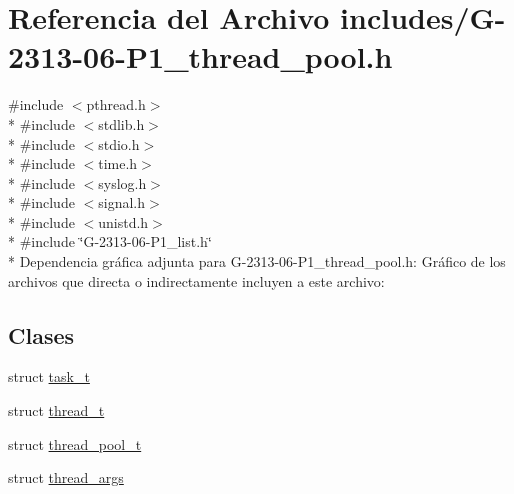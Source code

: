 \hypertarget{G-2313-06-P1__thread__pool_8h}{}\section{Referencia del Archivo includes/\+G-\/2313-\/06-\/\+P1\+\_\+thread\+\_\+pool.h}
\label{G-2313-06-P1__thread__pool_8h}
{\ttfamily \#include $<$pthread.\+h$>$}\\*
{\ttfamily \#include $<$stdlib.\+h$>$}\\*
{\ttfamily \#include $<$stdio.\+h$>$}\\*
{\ttfamily \#include $<$time.\+h$>$}\\*
{\ttfamily \#include $<$syslog.\+h$>$}\\*
{\ttfamily \#include $<$signal.\+h$>$}\\*
{\ttfamily \#include $<$unistd.\+h$>$}\\*
{\ttfamily \#include \char`\"{}G-\/2313-\/06-\/\+P1\+\_\+list.\+h\char`\"{}}\\*
Dependencia gráfica adjunta para G-\/2313-\/06-\/\+P1\+\_\+thread\+\_\+pool.h\+:
Gráfico de los archivos que directa o indirectamente incluyen a este archivo\+:
\subsection*{Clases}
\begin{DoxyCompactItemize}
\item 
struct \hyperlink{structtask__t}{task\+\_\+t}
\item 
struct \hyperlink{structthread__t}{thread\+\_\+t}
\item 
struct \hyperlink{structthread__pool__t}{thread\+\_\+pool\+\_\+t}
\item 
struct \hyperlink{structthread__args}{thread\+\_\+args}
\end{DoxyCompactItemize}
